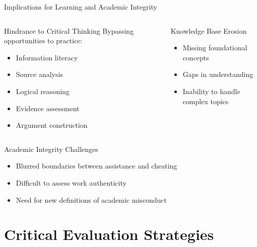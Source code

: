\documentclass{beamer}
\begin{document}
\begin{frame}{Implications for Learning and Academic Integrity}
\begin{columns}
\begin{block}{Hindrance to Critical Thinking}
Bypassing opportunities to practice:
\begin{itemize}
  \item Information literacy
  \item Source analysis
  \item Logical reasoning
  \item Evidence assessment
  \item Argument construction
\end{itemize}
\end{block}

\pause

\begin{block}{Knowledge Base Erosion}
\begin{itemize}
  \item Missing foundational concepts
  \item Gaps in understanding
  \item Inability to handle complex topics
\end{itemize}
\end{block}
\end{columns}

\pause

\begin{block}{Academic Integrity Challenges}
\begin{itemize}
  \item Blurred boundaries between assistance and cheating
  \item Difficult to assess work authenticity
  \item Need for new definitions of academic misconduct
\end{itemize}
\end{block}
\end{frame}

\section{Critical Evaluation Strategies}
\end{document}
